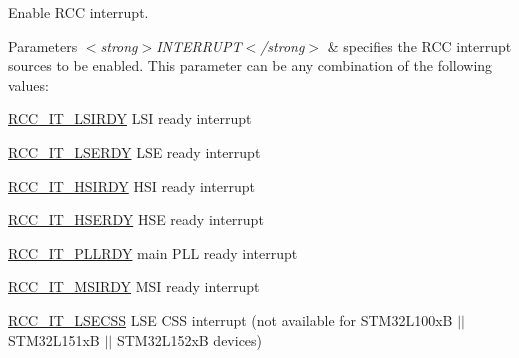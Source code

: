 Enable R\-C\-C interrupt. 


\begin{DoxyParams}{Parameters}
{\em $<$strong$>$\-I\-N\-T\-E\-R\-R\-U\-P\-T$<$/strong$>$} & specifies the R\-C\-C interrupt sources to be enabled. This parameter can be any combination of the following values\-: \begin{DoxyItemize}
\item \hyperlink{group___r_c_c___interrupt_ga2b4ef277c1b71f96e0bef4b9a72fca94}{R\-C\-C\-\_\-\-I\-T\-\_\-\-L\-S\-I\-R\-D\-Y} L\-S\-I ready interrupt \item \hyperlink{group___r_c_c___interrupt_gad6b6e78a426850f595ef180d292a673d}{R\-C\-C\-\_\-\-I\-T\-\_\-\-L\-S\-E\-R\-D\-Y} L\-S\-E ready interrupt \item \hyperlink{group___r_c_c___interrupt_ga69637e51b71f73f519c8c0a0613d042f}{R\-C\-C\-\_\-\-I\-T\-\_\-\-H\-S\-I\-R\-D\-Y} H\-S\-I ready interrupt \item \hyperlink{group___r_c_c___interrupt_gad13eaede352bca59611e6cae68665866}{R\-C\-C\-\_\-\-I\-T\-\_\-\-H\-S\-E\-R\-D\-Y} H\-S\-E ready interrupt \item \hyperlink{group___r_c_c___interrupt_ga68d48e7811fb58f2649dce6cf0d823d9}{R\-C\-C\-\_\-\-I\-T\-\_\-\-P\-L\-L\-R\-D\-Y} main P\-L\-L ready interrupt \item \hyperlink{group___r_c_c___interrupt_gae0cfda620ac8949e5b266661dba7ba0a}{R\-C\-C\-\_\-\-I\-T\-\_\-\-M\-S\-I\-R\-D\-Y} M\-S\-I ready interrupt \item \hyperlink{group___r_c_c___interrupt_gaf3f259914cb56820b1649c9d4413736c}{R\-C\-C\-\_\-\-I\-T\-\_\-\-L\-S\-E\-C\-S\-S} L\-S\-E C\-S\-S interrupt (not available for S\-T\-M32\-L100x\-B $\vert$$\vert$ S\-T\-M32\-L151x\-B $\vert$$\vert$ S\-T\-M32\-L152x\-B devices) \end{DoxyItemize}
\\
\hline
\end{DoxyParams}
